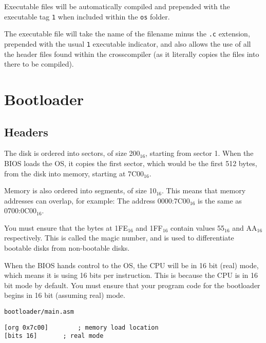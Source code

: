 \documentclass{article}
\begin{document}
Executable files will be automatically compiled and prepended with the
executable tag \verb|1| when included within the \verb|os| folder.

The executable file will take the name of the filename minus the \verb|.c|
extension, prepended with the usual \verb|1| executable indicator, and
also allows the use of all the header files found within the crosscompiler
(as it literally copies the files into there to be compiled).


\newpage

\section{Bootloader}

\subsection{Headers}

The disk is ordered into sectors, of size 200$_{16}$, starting from sector 1\cite{sector size}.
When the BIOS loads the OS, it copies the first sector,
which would be the first 512 bytes, from the disk into memory,
starting at 7C00$_{16}$\cite{7c00}.

Memory is also ordered into segments, of size 10$_{16}$\cite{memory segments}. This means that memory
addresses can overlap, for example:
The address 0000:7C00$_{16}$ is the same as 0700:0C00$_{16}$.

You must ensure that the bytes at 1FE$_{16}$ and 1FF$_{16}$
contain values 55$_{16}$ and AA$_{16}$ respectively\cite{55aa}.
This is called the magic number, and is used to differentiate
bootable disks from non-bootable disks.

When the BIOS hands control to the OS, the CPU will be in 16 bit (real) mode\cite{16bitstart},
which means it is using 16 bits per instruction. This is because the CPU is in
16 bit mode by default. You must ensure that your program code for the bootloader
begins in 16 bit (assuming real) mode.

\begin{verbatim}
bootloader/main.asm
\end{verbatim}
\begin{verbatim}
[org 0x7c00]		; memory load location
[bits 16]		; real mode
\end{verbatim}
\end{document}
